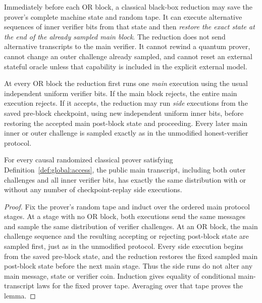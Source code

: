 \begin{definition}\label{def:global:access}
Immediately before each OR block, a classical
black-box reduction may save the prover's
complete machine state and random tape.
It can execute alternative sequences of
inner verifier bits from that state and
then \emph{restore the exact state at the
end of the already sampled main block}.
The reduction does not send alternative
transcripts to the main verifier.
It cannot rewind a quantum prover,
cannot change an outer challenge already
sampled, and cannot reset an external
stateful oracle unless that capability is
included in the explicit external model.
\end{definition}

\begin{definition}\label{def:global:main}
At every OR block the reduction first runs
one \emph{main} execution using the usual
independent uniform verifier bits. If the
main block rejects, the entire main
execution rejects. If it accepts, the
reduction may run \emph{side} executions
from the saved pre-block checkpoint,
using new independent uniform inner bits,
before restoring the accepted main
post-block state and proceeding.
Every later main inner or outer challenge
is sampled exactly as in the unmodified
honest-verifier protocol.
\end{definition}

\begin{lemma}\label{lem:global:main-law}
For every causal randomized classical prover
satisfying Definition~\ref{def:global:access},
the public main transcript, including both outer
challenges and all inner verifier bits, has
exactly the same distribution with or without
any number of checkpoint-replay side executions.
\end{lemma}
\begin{proof}
Fix the prover's random tape and induct over
the ordered main protocol stages.
At a stage with no OR block, both executions
send the same messages and sample the same
distribution of verifier challenges.
At an OR block, the main challenge sequence
and the resulting accepting or rejecting
post-block state are sampled first, just
as in the unmodified protocol.
Every side execution begins from the
saved pre-block state, and the reduction
restores the fixed sampled main post-block
state before the next main stage.
Thus the side runs do not alter any
main message, state or verifier coin.
Induction gives equality of conditional
main-transcript laws for the fixed
prover tape. Averaging over that tape
proves the lemma.
\end{proof}

